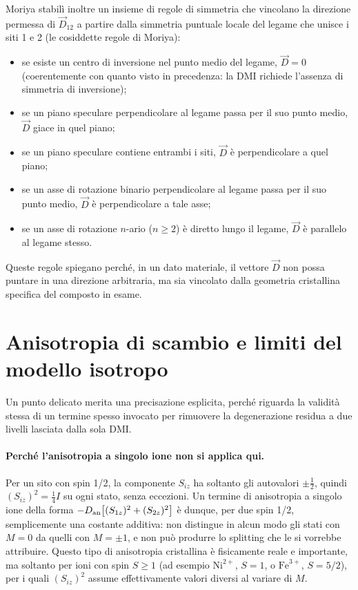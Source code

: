 \documentclass[11pt,a4paper]{article}
\begin{document}
Moriya stabil\`i inoltre un insieme di regole di simmetria che vincolano la direzione
permessa di $\vec D_{12}$ a partire dalla simmetria puntuale locale del legame che
unisce i siti 1 e 2 (le cosiddette regole di Moriya):
\begin{itemize}
\item se esiste un centro di inversione nel punto medio del legame, $\vec D=0$
(coerentemente con quanto visto in precedenza: la DMI richiede l'assenza di simmetria
di inversione);
\item se un piano speculare perpendicolare al legame passa per il suo punto medio,
$\vec D$ giace in quel piano;
\item se un piano speculare contiene entrambi i siti, $\vec D$ \`e perpendicolare a
quel piano;
\item se un asse di rotazione binario perpendicolare al legame passa per il suo punto
medio, $\vec D$ \`e perpendicolare a tale asse;
\item se un asse di rotazione $n$-ario ($n\geq2$) \`e diretto lungo il legame, $\vec
D$ \`e parallelo al legame stesso.
\end{itemize}
Queste regole spiegano perch\'e, in un dato materiale, il vettore $\vec D$ non possa
puntare in una direzione arbitraria, ma sia vincolato dalla geometria cristallina
specifica del composto in esame.

\section{Anisotropia di scambio e limiti del modello isotropo}

Un punto delicato merita una precisazione esplicita, perch\'e riguarda la validit\`a
stessa di un termine spesso invocato per rimuovere la degenerazione residua a due
livelli lasciata dalla sola DMI.

\paragraph{Perch\'e l'anisotropia a singolo ione non si applica qui.} Per un sito con
spin 1/2, la componente $S_{iz}$ ha soltanto gli autovalori $\pm\tfrac12$, quindi
$(S_{iz})^2=\tfrac14 I$ su ogni stato, senza eccezioni. Un termine di anisotropia a
singolo ione della forma $-D_{\rm an}\big[(S_{1z})^2+(S_{2z})^2\big]$ \`e dunque, per
due spin 1/2, semplicemente una costante additiva: non distingue in alcun modo gli
stati con $M=0$ da quelli con $M=\pm1$, e non pu\`o produrre lo splitting che le si
vorrebbe attribuire. Questo tipo di anisotropia cristallina \`e fisicamente reale e
importante, ma soltanto per ioni con spin $S\geq1$ (ad esempio $\mathrm{Ni}^{2+}$,
$S=1$, o $\mathrm{Fe}^{3+}$, $S=5/2$), per i quali $(S_{iz})^2$ assume effettivamente
valori diversi al variare di $M$.
\end{document}
